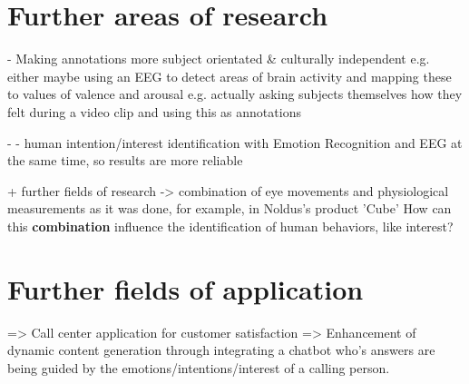\section{Further areas of research}
- Making annotations more subject orientated \& culturally independent
e.g. either maybe using an EEG to detect areas of brain activity and mapping these to values of valence and arousal
e.g. actually asking subjects themselves how they felt during a video clip and using this as annotations


- - human intention/interest identification with Emotion Recognition and EEG at the same time, so results are more reliable

+ further fields of research
        -> combination of eye movements and physiological measurements as it was done, for example, in Noldus's product 'Cube' \citep{Noldus:2020:Facereader}
        How can this\textbf{ combination} influence the identification of human behaviors, like interest?

\section{Further fields of application}
=> Call center application for customer satisfaction
=> Enhancement of dynamic content generation through integrating a chatbot who's answers are being guided by the emotions/intentions/interest of a calling person.



